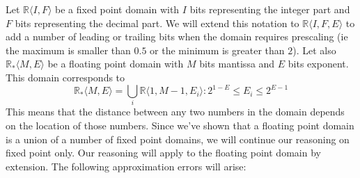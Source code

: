 \documentclass[runningheads,a4paper]{llncs}
\begin{document}
Let $\mathbb{R} \langle I,F \rangle$ be a fixed point domain with $I$ bits representing the integer part and $F$ bits
representing the decimal part. We will extend this notation to $\mathbb{R} \langle I,F,E \rangle$ to add a number of
leading or trailing bits when the domain requires prescaling (ie the maximum is smaller than $0.5$ or the minimum
is greater than $2$).
Let also $\mathbb{R}_* \langle M,E \rangle$ be a floating point domain with $M$ bits
mantissa and $E$ bits exponent. This domain corresponds to 
$$\mathbb{R}_* \langle M,E \rangle = \bigcup_i \mathbb{R} \langle 1,M-1,E_i \rangle : 2^{1-E} \leq E_i  \leq 2^{E-1}$$
This means that the distance between any two numbers in the domain depends on the
location of those numbers.
Since we've shown that a floating point domain is a union of a number of fixed point domains, we will continue our
reasoning on fixed point only. Our reasoning will apply to the floating point domain by extension.
The following approximation errors will arise:
\end{document}
